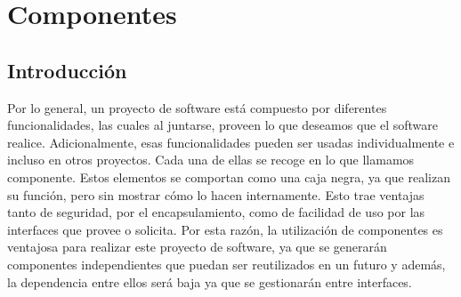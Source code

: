 \chapter{Componentes}
\section{Introducción}
Por lo general, un proyecto de software está compuesto por diferentes funcionalidades, las cuales al juntarse, proveen lo que deseamos que el software realice. Adicionalmente, esas funcionalidades pueden ser usadas individualmente e incluso en otros proyectos. Cada una de ellas se recoge en lo que llamamos componente. Estos elementos se comportan como una caja negra, ya que realizan su función, pero sin mostrar cómo lo hacen internamente. Esto trae ventajas tanto de seguridad, por el encapsulamiento, como de facilidad de uso por las interfaces que provee o solicita.
Por esta razón, la utilización de componentes es ventajosa para realizar este proyecto de software, ya que se generarán componentes independientes que puedan ser reutilizados en un futuro y además, la dependencia entre ellos será baja ya que se gestionarán entre interfaces.
